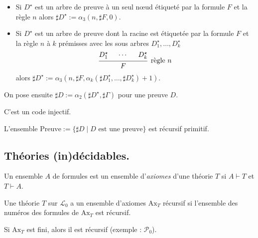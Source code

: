 \documentclass[./main]{subfiles}
\begin{document}
 \begin{defn}
   \begin{itemize}
     \item Si $D^\star$ est un arbre de preuve à un seul nœud étiqueté par la formule  $F$ et la règle $n$ alors $\sharp D^\star := \alpha_3(n, \sharp F, 0)$.
     \item Si $D^\star$ est un arbre de preuve dont la racine est étiquetée par la formule  $F$ et la règle $n$ à $k$ prémisses avec les sous arbres $D_1^\star, \ldots, D_k^\star$ 
       \[
       \begin{prooftree}
         \hypo{D_1^\star} \hypo{\cdots} \hypo{D_k^\star}
         \infer 3[\text{règle $n$}]{F}
       \end{prooftree}
       \]
       alors $\sharp D^\star := \alpha_3(n, \sharp F, \alpha_k(\sharp D_1^\star, \ldots, \sharp D_k^\star) + 1)$.
   \end{itemize}

   On pose ensuite $\sharp D := \alpha_2(\sharp D^\star, \sharp \Gamma)$ pour une preuve $D$.
 \end{defn}

 \begin{lem}
   C'est un code injectif.
 \end{lem}
 \begin{lem}
   L'ensemble $\mathrm{Preuve} := \{\sharp D  \mid D \text{ est une preuve}\}$ est récursif primitif.
 \end{lem}

 \subsection{Théories (in)décidables.}

 \begin{defn}
   Un ensemble $A$ de formules est un ensemble d'\textit{axiomes} d'une théorie $T$ si $A \vdash T$ et $T \vdash A$.
 \end{defn}

 \begin{defn}
   Une théorie $T$ sur $\mathcal{L}_0$ a un ensemble d'axiomes $\mathrm{Ax}_T$ récursif si l'ensemble des numéros des formules de $\mathrm{Ax}_T$ est récursif.
 \end{defn}
 \begin{rmk}
   Si $\mathrm{Ax}_T$ est fini, alors il est récursif (exemple : $\mathcal{P}_0$).
 \end{rmk}
\end{document}
